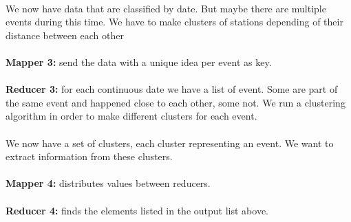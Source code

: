 \\
We now have data that are classified by date. But maybe there are multiple events during this time. We have to make clusters of stations depending of their distance between each other\\
\\
\textbf{Mapper 3:} send the data with a unique idea per event as key.\\
\\
\textbf{Reducer 3:} for each continuous date we have a list of event. Some are part of the same event and happened close to each other, some not. We run a clustering algorithm in order to make different clusters for each event.\\
\\
We now have a set of clusters, each cluster representing an event. We want to extract information from these clusters.\\
\\
\textbf{Mapper 4:} distributes values between reducers.\\
\\
\textbf{Reducer 4:} finds the elements listed in the output list above.
